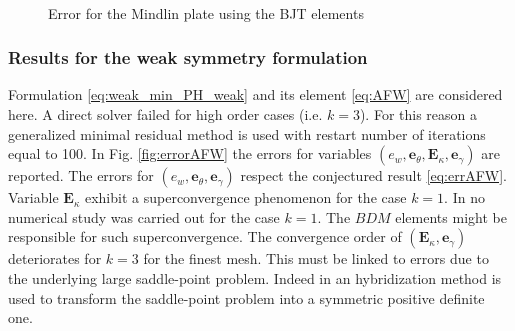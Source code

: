\begin{figure}[ht]%
	\centering
	\hspace{8pt}%
	 \\
	\hspace{8pt}%
	\caption[errorBEC]{Error for the Mindlin plate using the BJT elements}%
	\label{fig:errorBEC}%
\end{figure}

\subsubsection{Results for the weak symmetry formulation} 
Formulation \eqref{eq:weak_min_PH_weak} and its element \eqref{eq:AFW} are considered here. A direct solver failed for high order cases (i.e. $k=3$). For this reason a generalized minimal residual method is used with restart number of iterations equal to 100. In Fig. \ref{fig:errorAFW} the errors for variables $(e_w, \bm{e}_\theta, \bm{E}_\kappa, \bm{e}_\gamma)$  are reported. The errors for $(e_w, \bm{e}_\theta, \bm{e}_\gamma)$ respect the conjectured result \eqref{eq:errAFW}. Variable $\bm{E}_\kappa$ exhibit a superconvergence phenomenon for the case $k=1$. In \cite{ArnoldWeak} no numerical study was carried out for the case $k=1$. The $BDM$ elements might be responsible for such superconvergence. The convergence order of $(\bm{E}_\kappa, \bm{e}_\gamma)$ deteriorates for $k=3$ for the finest mesh. This must be linked to errors due to the underlying large saddle-point problem. Indeed in \cite{ArnoldWeak} an hybridization method is used to transform the saddle-point problem into a symmetric positive definite one.

